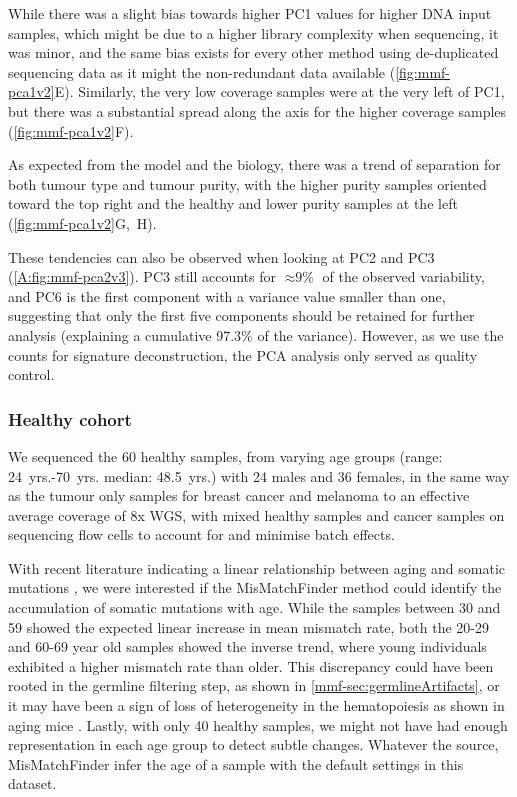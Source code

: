 While there was a slight bias towards higher PC1 values for higher DNA input samples, which might be due to a higher library complexity when sequencing, it was minor, and the same bias exists for every other method using de-duplicated sequencing data as it might  the non-redundant data available (\autoref{fig:mmf-pca1v2}E). Similarly, the very low coverage samples were at the very left of PC1, but there was a substantial spread along the axis for the higher coverage samples (\autoref{fig:mmf-pca1v2}F). 

As expected from the model and the biology, there was a trend of separation for both tumour type and tumour purity, with the higher purity samples oriented toward the top right and the healthy and lower purity samples at the left (\autoref{fig:mmf-pca1v2}G,~H).

These tendencies can also be observed when looking at PC2 and PC3 (\autoref{A:fig:mmf-pca2v3}). PC3 still accounts for $\approx \text{9\%}$ of the observed variability, and PC6 is the first component with a variance value smaller than one, suggesting that only the first five components should be retained for further analysis (explaining a cumulative 97.3\% of the variance). However, as we use the counts for signature deconstruction, the PCA analysis only served as quality control.


\subsubsection{Healthy cohort}
\label{mmf-sec:healthy}

We sequenced the 60 healthy samples, from varying age groups (range: \num{24}~yrs.-\num{70}~yrs. median: \num{48.5}~yrs.) with 24 males and 36 females, in the  same way as the tumour only samples for breast cancer and melanoma to an effective average coverage of 8x WGS, with mixed healthy samples and cancer samples on sequencing flow cells to account for and minimise batch effects.

With recent literature indicating a linear relationship between aging and somatic mutations \cite{Martincorena2018,Abascal2021,Cagan2022}, we were interested if the MisMatchFinder method could identify the accumulation of  somatic mutations with age. While the samples between 30 and 59 showed the expected linear increase in mean mismatch rate, both the 20-29 and 60-69 year old samples showed the inverse trend, where young individuals exhibited a higher mismatch rate than older. This discrepancy could have been rooted in the germline filtering step, as shown in \autoref{mmf-sec:germlineArtifacts}, or it may have been a sign of loss of heterogeneity in the hematopoiesis as shown in aging mice \cite{Ganuza2019}. Lastly, with only 40 healthy samples, we might not have had enough representation in each age group to detect subtle changes. Whatever the source, MisMatchFinder  infer the age of a sample with the default settings in this dataset.

